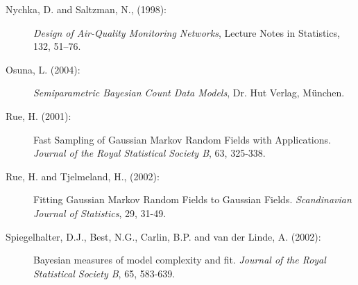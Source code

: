 \documentclass[11pt,a4paper,twoside]{bayesxarticle}
\begin{document}
\begin{description}
\item[Nychka, D. and Saltzman, N., (1998):]
{\it Design of Air-Quality Monitoring Networks},
Lecture Notes in Statistics, 132, 51--76.

\item[Osuna, L. (2004):] {\it Semiparametric Bayesian Count Data
Models}, Dr. Hut Verlag, M\"{u}nchen.

\item[Rue, H. (2001):] Fast Sampling of Gaussian Markov Random Fields with Applications.
{\em Journal of the Royal Statistical Society B}, 63, 325-338.

\item[Rue, H. and Tjelmeland, H., (2002):]
Fitting Gaussian Markov Random Fields to Gaussian Fields. {\it
Scandinavian Journal of Statistics}, 29, 31-49.

\item[Spiegelhalter, D.J., Best, N.G., Carlin, B.P. and van der Linde, A. (2002):]
Bayesian measures of model complexity and fit. {\em Journal of the
Royal Statistical Society B}, 65, 583-639.

\end{description}


\hypertarget{index}{}
\end{document}
